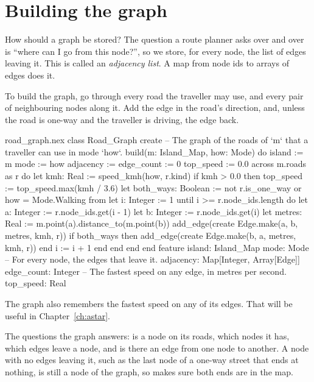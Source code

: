 \section{Building the graph}

How should a graph be stored? The question a route planner asks over and
over is ``where can I go from this node?'', so we store, for every node,
the list of edges leaving it. This is called an \emph{adjacency list}. A
map from node ids to arrays of edges does it.

To build the graph, go through every road the traveller may use, and every
pair of neighbouring nodes along it. Add the edge in the road's direction,
and, unless the road is one-way and the traveller is driving, the edge
back.

\begin{append}{road_graph.nex}
class Road_Graph
create
  -- The graph of the roads of `m` that a traveller can use in mode `how`.
  build(m: Island_Map, how: Mode) do
    island := m
    mode := how
    adjacency := {}
    edge_count := 0
    top_speed := 0.0
    across m.roads as r do
      let kmh: Real := speed_kmh(how, r.kind)
      if kmh > 0.0 then
        top_speed := top_speed.max(kmh / 3.6)
        let both_ways: Boolean := not r.is_one_way or how = Mode.Walking
        from
          let i: Integer := 1
        until
          i >= r.node_ids.length
        do
          let a: Integer := r.node_ids.get(i - 1)
          let b: Integer := r.node_ids.get(i)
          let metres: Real := m.point(a).distance_to(m.point(b))
          add_edge(create Edge.make(a, b, metres, kmh, r))
          if both_ways then
            add_edge(create Edge.make(b, a, metres, kmh, r))
          end
          i := i + 1
        end
      end
    end
  end
feature
  island: Island_Map
  mode: Mode
  -- For every node, the edges that leave it.
  adjacency: Map[Integer, Array[Edge]]
  edge_count: Integer
  -- The fastest speed on any edge, in metres per second.
  top_speed: Real
\end{append}

The graph also remembers the fastest speed on any of its edges. That will
be useful in Chapter~\ref{ch:astar}.

The questions the graph answers: is a node on its roads, which nodes it
has, which edges leave a node, and is there an edge from one node to
another. A node with no edges leaving it, such as the last node of a
one-way street that ends at nothing, is still a node of the graph, so
 makes sure both ends are in the map.

